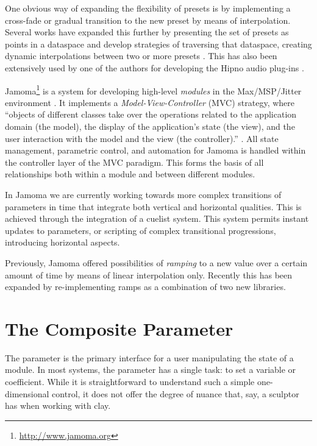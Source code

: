 \documentclass{article}
\begin{document}
One obvious way of expanding the flexibility of presets is by implementing a cross-fade or gradual transition to the new preset by means of interpolation. Several works have expanded this further by presenting the set of presets as points in a dataspace and develop strategies of traversing that dataspace, creating dynamic interpolations between two or more presets \cite{Bencina:2005metasurface, Dahlstedt:2001, Momeni:2003}. This has also been extensively used by one of the authors for developing the Hipno audio plug-ins \cite{Place:2005hipno}.

Jamoma\footnote{\url{http://www.jamoma.org}} is a system for developing high-level \emph{modules} in the Max/MSP/Jitter environment \cite{Place:2006}. It implements a \emph{Model-View-Controller} (MVC) strategy, where ``objects of different classes take over the operations related to the application domain (the model), the display of the application's state (the view), and the user interaction with the model and the view (the controller).'' \cite[p26]{Krasner:1988}. All state management, parametric control, and automation for Jamoma is handled within the controller layer of the MVC paradigm. This forms the basis of all relationships both within a module and between different modules.

In Jamoma we are currently working towards more complex transitions of parameters in time that integrate both vertical and horizontal qualities.  This is achieved through the integration of a cuelist system. This system permits instant updates to parameters, or scripting of complex transitional progressions, introducing horizontal aspects. 

Previously, Jamoma offered possibilities of \emph{ramping} to a new value over a certain amount of time by means of linear interpolation only. Recently this has been expanded by re-implementing ramps as a combination of two new libraries.


\section{The Composite Parameter} %
\label{sec:the_composite_parameter}

The parameter is the primary interface for a user manipulating the state of a module. In most systems, the parameter has a single task: to set a variable or coefficient. While it is straightforward to understand such a simple one-dimensional control, it does not offer the degree of nuance that, say, a sculptor has when working with clay.
\end{document}
